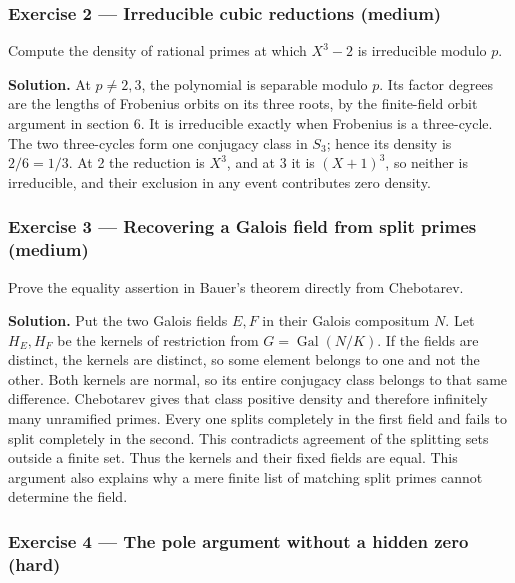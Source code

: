 \documentclass[11pt,a4paper]{article}
\begin{document}
\subsubsection{Exercise 2 --- Irreducible cubic reductions
(medium)}\label{exercise-2-irreducible-cubic-reductions-medium}

Compute the density of rational primes at which \(X^3-2\) is irreducible
modulo \(p\).

\textbf{Solution.} At \(p\ne2,3\), the polynomial is separable modulo
\(p\). Its factor degrees are the lengths of Frobenius orbits on its
three roots, by the finite-field orbit argument in section 6. It is
irreducible exactly when Frobenius is a three-cycle. The two
three-cycles form one conjugacy class in \(S_3\); hence its density is
\(2/6=1/3\). At 2 the reduction is \(X^3\), and at 3 it is \((X+1)^3\),
so neither is irreducible, and their exclusion in any event contributes
zero density.

\subsubsection{Exercise 3 --- Recovering a Galois field from split
primes
(medium)}\label{exercise-3-recovering-a-galois-field-from-split-primes-medium}

Prove the equality assertion in Bauer's theorem directly from
Chebotarev.

\textbf{Solution.} Put the two Galois fields \(E,F\) in their Galois
compositum \(N\). Let \(H_E,H_F\) be the kernels of restriction from
\(G=\operatorname{Gal}(N/K)\). If the fields are distinct, the kernels
are distinct, so some element belongs to one and not the other. Both
kernels are normal, so its entire conjugacy class belongs to that same
difference. Chebotarev gives that class positive density and therefore
infinitely many unramified primes. Every one splits completely in the
first field and fails to split completely in the second. This
contradicts agreement of the splitting sets outside a finite set. Thus
the kernels and their fixed fields are equal. This argument also
explains why a mere finite list of matching split primes cannot
determine the field.

\subsubsection{Exercise 4 --- The pole argument without a hidden zero
(hard)}\label{exercise-4-the-pole-argument-without-a-hidden-zero-hard}
\end{document}
